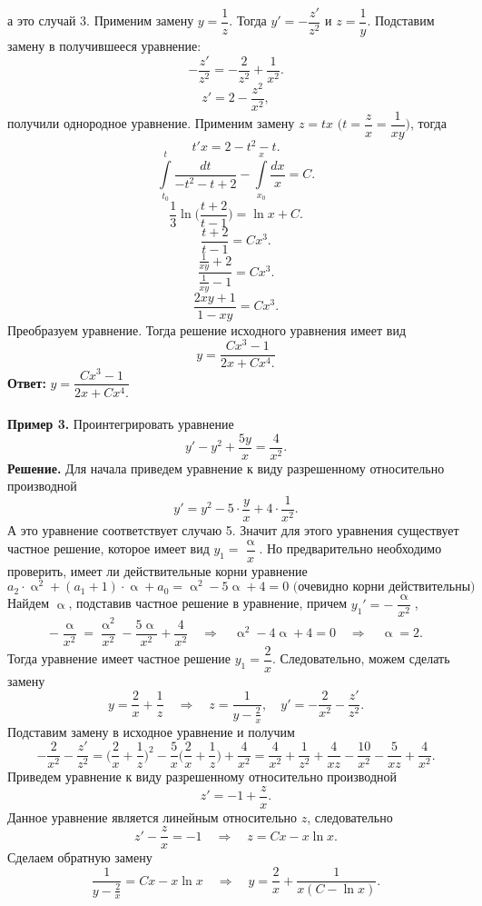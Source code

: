 \documentclass[a4paper, 12pt]{article}
\renewcommand{\alpha}{\upalpha}
\renewcommand{\alpha}{\upalpha}
\begin{document}
	а это случай 3. Применим замену $y = \dfrac{1}{z}$. Тогда $y' = -\dfrac{z'}{z^2}$ и $z = \dfrac{1}{y}$. Подставим замену в получившееся уравнение: $$-\dfrac{z'}{z^2} = -\dfrac{2}{z^2} + \dfrac{1}{x^2}.$$
	$$z' = 2 - \dfrac{z^2}{x^2},$$
	получили однородное уравнение. Применим замену $z = tx$ $\Big(t = \dfrac{z}{x} = \dfrac{1}{xy}\Big)$, тогда $$t'x = 2 - t^2 - t.$$
	$$\int\limits_{t_0}^t\dfrac{dt}{-t^2-t+2} - \int\limits_{x_0}^x\dfrac{dx}{x} = C.$$
	$$\dfrac{1}{3}\ln\Big(\dfrac{t+2}{t-1}\Big) = \ln x + C.$$
	$$\dfrac{t+2}{t-1} = Cx^3.$$
	$$\dfrac{\frac{1}{xy} + 2}{\frac{1}{xy} - 1} = Cx^3.$$
	$$\dfrac{2xy + 1}{1 - xy} = Cx^3.$$
	Преобразуем уравнение. Тогда решение исходного уравнения имеет вид $$y = \dfrac{Cx^3 - 1}{2x + Cx^4.}$$
	\textbf{Ответ:} $y = \dfrac{Cx^3 - 1}{2x + Cx^4.}$\\\\
	\textbf{Пример 3.} Проинтегрировать уравнение $$y' - y^2 + \dfrac{5y}{x} = \dfrac{4}{x^2}.$$
	\textbf{Решение.} Для начала приведем уравнение к виду разрешенному относительно производной $$y' = y^2 - 5\cdot\dfrac{y}{x} + 4\cdot \dfrac{1}{x^2}.$$
	А это уравнение соответствует случаю 5. Значит для этого уравнения существует частное решение, которое имеет вид $y_1 = \dfrac{\alpha}{x}$. Но предварительно необходимо проверить, имеет ли действительные корни уравнение $$a_2\cdot \alpha^2 + (a_1 + 1)\cdot \alpha + a_0 = \alpha^2 -5\alpha + 4 = 0\text{ (очевидно корни действительны)}$$ Найдем $\alpha$, подставив частное решение в уравнение, причем $y_1' = -\dfrac{\alpha}{x^2}$,
	$$-\dfrac{\alpha}{x^2} = \dfrac{\alpha^2}{x^2} - \dfrac{5\alpha}{x^2} + \dfrac{4}{x^2}\quad\Rightarrow\quad\alpha^2 -4\alpha + 4 =0\quad\Rightarrow\quad \alpha = 2.$$
	Тогда уравнение имеет частное решение $y_1 = \dfrac{2}{x}$. Следовательно, можем сделать замену $$y = \dfrac{2}{x} + \dfrac{1}{z}\quad \Rightarrow\quad z = \dfrac{1}{y - \frac2x},\quad y' = -\dfrac{2}{x^2} - \dfrac{z'}{z^2}.$$ 
	Подставим замену в исходное уравнение и получим
	$$ -\dfrac{2}{x^2} - \dfrac{z'}{z^2} = \Big(\dfrac{2}{x} + \dfrac{1}{z}\Big)^2 - \dfrac{5}{x}\Big(\dfrac{2}{x} + \dfrac{1}{z}\Big) + \dfrac{4}{x^2} =  \dfrac{4}{x^2} + \dfrac{1}{z^2} + \dfrac{4}{xz} - \dfrac{10}{x^2} - \dfrac{5}{xz} + \dfrac{4}{x^2}.$$
	Приведем уравнение к виду разрешенному относительно производной
	$$z' = -1 + \dfrac{z}{x}.$$
	Данное уравнение является линейным относительно $z$, следовательно $$z' - \dfrac{z}{x} = -1\quad\Rightarrow\quad z = Cx - x\ln x.$$
	Сделаем обратную замену
	$$\dfrac{1}{y - \frac2x}=Cx - x\ln x\quad\Rightarrow\quad y = \dfrac{2}{x} + \dfrac{1}{x(C-\ln x)}.$$
\end{document}
